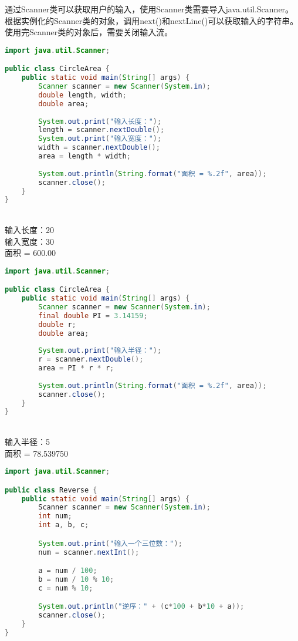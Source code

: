 通过Scanner类可以获取用户的输入，使用Scanner类需要导入java.util.Scanner。根据实例化的Scanner类的对象，调用next()和nextLine()可以获取输入的字符串。 \\

使用完Scanner类的对象后，需要关闭输入流。 \\

\begin{lstlisting}[language=Java]
import java.util.Scanner;

public class CircleArea {
	public static void main(String[] args) {
		Scanner scanner = new Scanner(System.in);
		double length, width;
		double area;
		
		System.out.print("输入长度：");
		length = scanner.nextDouble();
		System.out.print("输入宽度：");
		width = scanner.nextDouble();
		area = length * width;
		
		System.out.println(String.format("面积 = %.2f", area));
		scanner.close();
	}
}
\end{lstlisting}

\begin{tcolorbox}
	 \\
	输入长度：20 \\
	输入宽度：30 \\
	面积 = 600.00
\end{tcolorbox}

\vspace{0.5cm}
\begin{lstlisting}[language=Java]
import java.util.Scanner;

public class CircleArea {
	public static void main(String[] args) {
		Scanner scanner = new Scanner(System.in);
		final double PI = 3.14159;
		double r;
		double area;
		
		System.out.print("输入半径：");
		r = scanner.nextDouble();
		area = PI * r * r;
		
		System.out.println(String.format("面积 = %.2f", area));
		scanner.close();
	}
}
\end{lstlisting}

\begin{tcolorbox}
	 \\
	输入半径：5 \\
	面积 = 78.539750
\end{tcolorbox}

\vspace{0.5cm}
\begin{lstlisting}[language=Java]
import java.util.Scanner;

public class Reverse {
	public static void main(String[] args) {
		Scanner scanner = new Scanner(System.in);
		int num;
		int a, b, c;

		System.out.print("输入一个三位数：");
		num = scanner.nextInt();

		a = num / 100;
		b = num / 10 % 10;
		c = num % 10;

		System.out.println("逆序：" + (c*100 + b*10 + a));
		scanner.close();
	}
}
\end{lstlisting}

